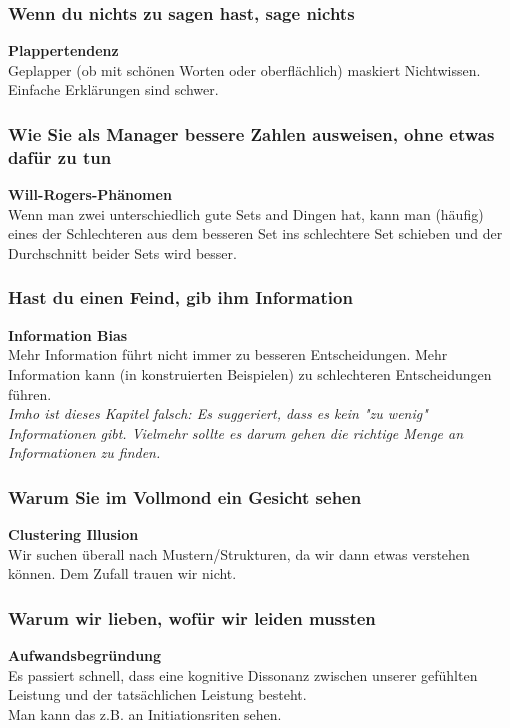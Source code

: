 \documentclass[a4paper, twocolumn]{article}
\begin{document}
\subsubsection*{Wenn du nichts zu sagen hast, sage nichts}
\textbf{Plappertendenz}\\
Geplapper (ob mit schönen Worten oder oberflächlich) maskiert Nichtwissen. Einfache Erklärungen sind schwer.

\subsubsection*{Wie Sie als Manager bessere Zahlen ausweisen, ohne etwas dafür zu tun}
\textbf{Will-Rogers-Phänomen}\\
Wenn man zwei unterschiedlich gute Sets and Dingen hat, kann man (häufig) eines der Schlechteren aus dem besseren Set ins schlechtere Set schieben und der Durchschnitt beider Sets wird besser.

\subsubsection*{Hast du einen Feind, gib ihm Information}
\textbf{Information Bias}\\
Mehr Information führt nicht immer zu besseren Entscheidungen. Mehr Information kann (in konstruierten Beispielen) zu schlechteren Entscheidungen führen.\\
\textit{Imho ist dieses Kapitel falsch: Es suggeriert, dass es kein "zu wenig" Informationen gibt. Vielmehr sollte es darum gehen die richtige Menge an Informationen zu finden.}

\subsubsection*{Warum Sie im Vollmond ein Gesicht sehen}
\textbf{Clustering Illusion}\\
Wir suchen überall nach Mustern/Strukturen, da wir dann etwas verstehen können. Dem Zufall trauen wir nicht.

\subsubsection*{Warum wir lieben, wofür wir leiden mussten}
\textbf{Aufwandsbegründung}\\
Es passiert schnell, dass eine kognitive Dissonanz zwischen unserer gefühlten Leistung und der tatsächlichen Leistung besteht.\\
Man kann das z.B. an Initiationsriten sehen.
\end{document}
